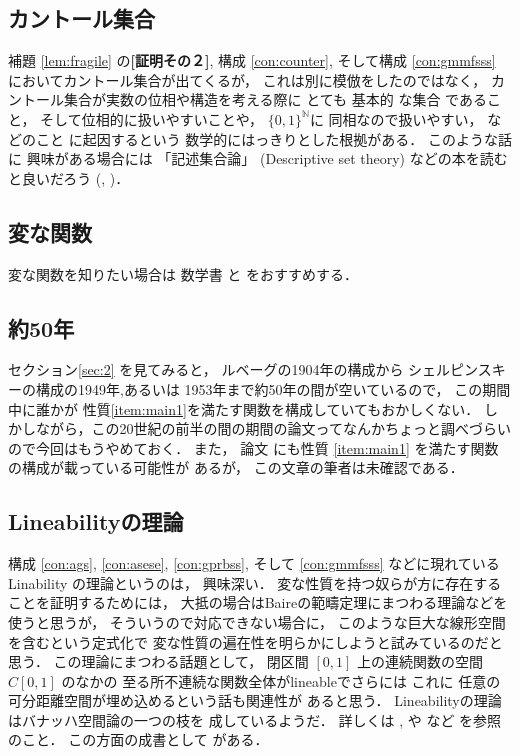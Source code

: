 \documentclass[leqno, a4paper, 12pt]{jsarticle}
\theoremstyle{definition}
\newcommand{\nn}{\mathbb{N}}
\begin{document}
\subsection{カントール集合}
補題
\ref{lem:fragile}
の\textbf{[証明その２]}, 
構成
\ref{con:counter}, 
\cite[Sec.3]{MR3293811}
そして構成
\ref{con:gmmfsss}
においてカントール集合が出てくるが，
これは別に模倣をしたのではなく，
カントール集合が実数の位相や構造を考える際に
とても
基本的
な集合
であること，
そして位相的に扱いやすいことや，
$\{0,1 \}^{\nn}$に
同相なので扱いやすい，
などのこと
に起因するという
数学的にはっきりとした根拠がある．
このような話に
興味がある場合には
「記述集合論」
(Descriptive set theory)
などの本を読むと良いだろう
(\cite{MR1321597}, 
\cite{MR1619545})．



\subsection{変な関数}
変な関数を知りたい場合は
数学書
\cite{MR2067444}
と
\cite{MR3645463}
をおすすめする．


\subsection{約50年}
セクション\ref{sec:2}
を見てみると，
ルベーグの1904年の構成から
シェルピンスキーの構成の1949年,あるいは
1953年まで約50年の間が空いているので，
この期間中に誰かが
性質\ref{item:main1}を満たす関数を構成していてもおかしくない．
しかしながら，この20世紀の前半の間の期間の論文ってなんかちょっと調べづらいので今回はもうやめておく．
また，
論文
\cite{MR0393377}
にも性質
\ref{item:main1}
を満たす関数の構成が載っている可能性が
あるが，
この文章の筆者は未確認である．


\subsection{Lineabilityの理論}
構成
\ref{con:ags}, 
\ref{con:asese}, 
\ref{con:gprbss}, 
そして
\ref{con:gmmfsss}
などに現れているLinability
の理論というのは，
興味深い．
変な性質を持つ奴らが方に存在することを証明するためには，
大抵の場合はBaireの範疇定理にまつわる理論などを使うと思うが，
そういうので対応できない場合に，
このような巨大な線形空間を含むという定式化で
変な性質の遍在性を明らかにしようと試みているのだと思う．
この理論にまつわる話題として，
閉区間
$[0, 1]$
上の連続関数の空間
$C[0, 1]$
のなかの
至る所不連続な関数全体がlineableでさらには
これに
任意の可分距離空間が埋め込めるという話も関連性が
あると思う．
Lineabilityの理論はバナッハ空間論の一つの枝を
成しているようだ．
詳しくは
\cite{MR3119823}, 
\cite{MR2643865}
や
\cite{MR2113929}
など
を参照のこと．
この方面の成書として
\cite{MR3445906}
がある．
\end{document}
